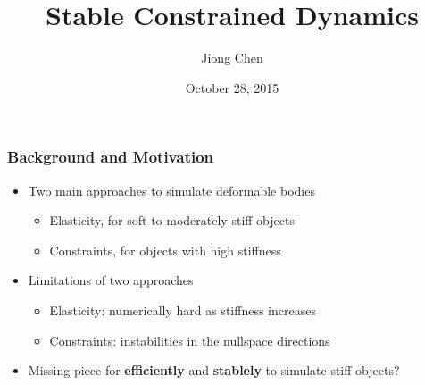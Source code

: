 \documentclass[serif,mathserif]{beamer}
\author[Jiong Chen]{Jiong Chen}
\title[\hspace{2em}\insertframenumber/\inserttotalframenumber]{Stable Constrained Dynamics}
\date{October 28, 2015} %
\begin{document}
\maketitle

\begin{frame}
 \frametitle{Background and Motivation}
 \begin{itemize}
  \item Two main approaches to simulate deformable bodies
    \begin{itemize}
     \item \color{red}Elasticity, for soft to moderately stiff objects
     \item \color{green}Constraints, for objects with high stiffness
    \end{itemize}
  \item Limitations of two approaches
    \begin{itemize}
      \item \color{red} Elasticity: numerically hard as stiffness increases
      \item \color{green} Constraints: instabilities in the nullspace directions
    \end{itemize}
  \item Missing piece for \textbf{\color{orange}efficiently} and \textbf{\color{orange}stablely} to simulate stiff objects?
  \pause
 \end{itemize}
\end{frame}
\end{document}
